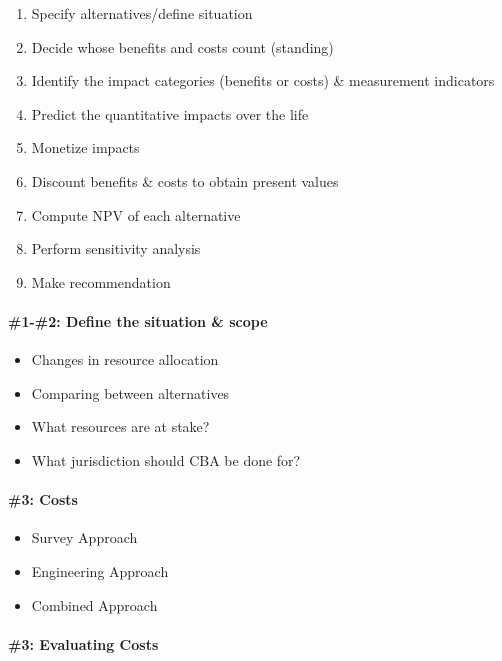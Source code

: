 \documentclass[]{article}
\providecommand{\tightlist}{%
  \setlength{\itemsep}{0pt}\setlength{\parskip}{0pt}}
\let\oldparagraph\paragraph
\renewcommand{\paragraph}[1]{\oldparagraph{#1}\mbox{}}
\begin{document}
\begin{enumerate}
\def\labelenumi{\arabic{enumi}.}
\tightlist
\item
  Specify alternatives/define situation
\item
  Decide whose benefits and costs count (standing)
\item
  Identify the impact categories (benefits or costs) \& measurement
  indicators
\item
  Predict the quantitative impacts over the life
\item
  Monetize impacts
\item
  Discount benefits \& costs to obtain present values
\item
  Compute NPV of each alternative
\item
  Perform sensitivity analysis
\item
  Make recommendation
\end{enumerate}

\hypertarget{define-the-situation-scope}{%
\paragraph{\#1-\#2: Define the situation \&
scope}\label{define-the-situation-scope}}

\begin{itemize}
\tightlist
\item
  Changes in resource allocation
\item
  Comparing between alternatives
\item
  What resources are at stake?
\item
  What jurisdiction should CBA be done for?
\end{itemize}

\hypertarget{costs}{%
\paragraph{\#3: Costs}\label{costs}}

\begin{itemize}
\tightlist
\item
  Survey Approach
\item
  Engineering Approach
\item
  Combined Approach
\end{itemize}

\hypertarget{evaluating-costs}{%
\paragraph{\#3: Evaluating Costs}\label{evaluating-costs}}
\end{document}
